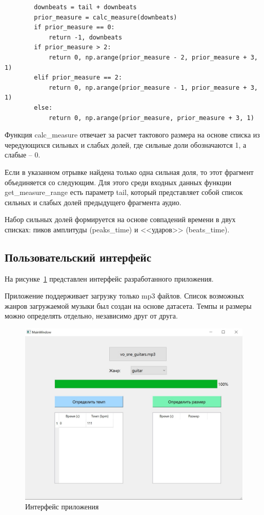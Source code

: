 \begin{lstlisting}
		downbeats = tail + downbeats
		prior_measure = calc_measure(downbeats)
		if prior_measure == 0:
			return -1, downbeats
		if prior_measure > 2:
			return 0, np.arange(prior_measure - 2, prior_measure + 3, 1)
		elif prior_measure == 2:
			return 0, np.arange(prior_measure - 1, prior_measure + 3, 1)
		else:
			return 0, np.arange(prior_measure, prior_measure + 3, 1)
\end{lstlisting}

Функция calc\_measure отвечает за расчет тактового размера на основе списка из чередующихся сильных и слабых долей, где сильные доли обозначаются 1, а слабые -- 0.

Если в указанном отрывке найдена только одна сильная доля, то этот фрагмент объединяется со следующим. Для этого среди входных данных функции get\_measure\_range есть параметр tail, который представляет собой список сильных и слабых долей предыдущего фрагмента аудио.

Набор сильных долей формируется на основе совпадений времени в двух списках: пиков амплитуды (peaks\_time) и <<ударов>> (beats\_time).

\subsection{Пользовательский интерфейс}

На рисунке~\ref{img:gui} представлен интерфейс разработанного приложения.

Приложение поддерживает загрузку только mp3 файлов. Список возможных жанров загружаемой музыки был создан на основе датасета. Темпы и размеры можно определять отдельно, независимо друг от друга.

\begin{figure}[h]
	\centering
	\includegraphics[scale=0.7]{inc/img/gui.jpg}
	\caption{Интерфейс приложения}
	\label{img:gui}
\end{figure}

